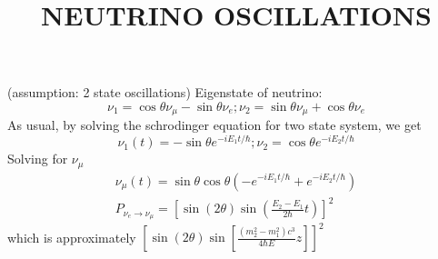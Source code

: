 \documentclass[12pt,letterpaper]{article}
\begin{document}
\title{NEUTRINO OSCILLATIONS}
\maketitle
(assumption: 2 state oscillations)
Eigenstate of neutrino:
\begin{equation}
\nu_1 = \cos \theta \nu_\mu - \sin \theta \nu_e ; \nu_2 = \sin \theta \nu_\mu + \cos \theta \nu_e
\end{equation}
As usual, by solving the schrodinger equation for two state system, we get
\begin{equation}
\nu_1(t) = -\sin \theta e^{-iE_1t/\hbar} ; \nu_2 = \cos \theta e^{-iE_2t/\hbar}
\end{equation}
Solving for $\nu_\mu$
\begin{eqnarray}
\nu_\mu(t) = \sin \theta \cos \theta (-e^{-iE_1t/\hbar} + e^{-iE_2t/\hbar}) \\
P_{\nu_e \rightarrow \nu_\mu} = \left[ \sin(2\theta) \sin(\frac{E_2 - E_1}{2\hbar}t) \right]^2
\end{eqnarray}
which is approximately $\left[ \sin(2\theta) \sin[\frac{(m_2^2 -m_1^2)c^3}{4\hbar E}z]\right]^2$
\end{document}

